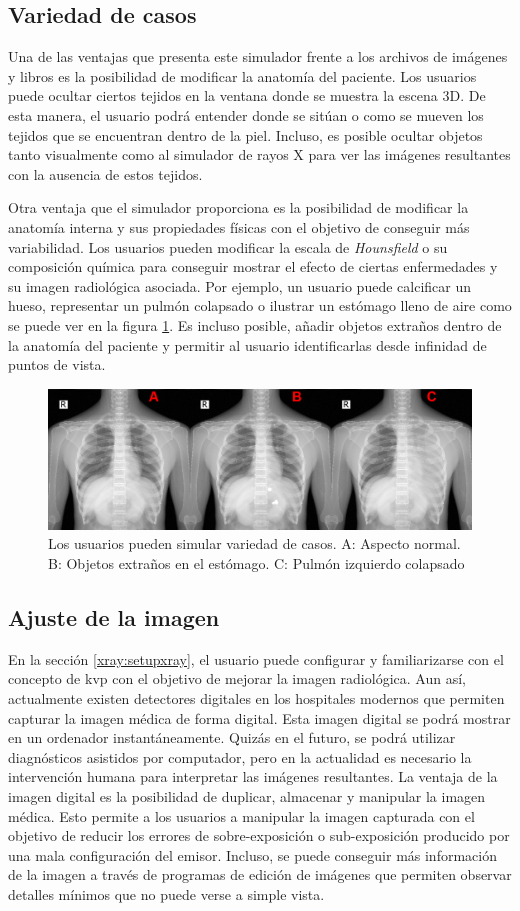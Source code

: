 \subsection{Variedad de casos}
\label{xray:variedad}
Una de las ventajas que presenta este simulador frente a los archivos de imágenes y libros es la posibilidad de modificar la anatomía del paciente. Los usuarios puede ocultar ciertos tejidos en la ventana donde se muestra la escena 3D. De esta manera, el usuario podrá entender donde se sitúan o como se mueven los tejidos que se encuentran dentro de la piel. Incluso, es posible ocultar objetos tanto visualmente como al simulador de rayos X para ver las imágenes resultantes con la ausencia de estos tejidos. 

Otra ventaja que el simulador proporciona es la posibilidad de modificar la anatomía interna y sus propiedades físicas con el objetivo de conseguir más variabilidad. Los usuarios pueden modificar la escala de \emph{Hounsfield} o su composición química para conseguir mostrar el efecto de ciertas enfermedades y su imagen radiológica asociada. Por ejemplo, un usuario puede calcificar un hueso, representar un pulmón colapsado o ilustrar un estómago lleno de aire como se puede ver en la figura \ref{fig:disease}. Es incluso posible, añadir objetos extraños dentro de la anatomía del paciente y permitir al usuario identificarlas desde infinidad de puntos de vista.

\begin{figure}[h]
\centering
\includegraphics[width=0.5\linewidth]{IMG/disease.png}
\caption{\label{fig:disease} Los usuarios pueden simular variedad de casos. A: Aspecto normal. B: Objetos extraños en el estómago. C: Pulmón izquierdo colapsado }
\end{figure}

\subsection{Ajuste de la imagen}
\label{xray:ajustes}
En la sección \ref{xray:setupxray}, el usuario puede configurar y familiarizarse con el concepto de \ac{kvp} con el objetivo de mejorar la imagen radiológica. Aun así, actualmente existen detectores digitales en los hospitales modernos que permiten capturar la imagen médica de forma digital. Esta imagen digital se podrá mostrar en un ordenador instantáneamente. Quizás en el futuro, se podrá utilizar diagnósticos asistidos por computador, pero en la actualidad es necesario la intervención humana para interpretar las imágenes resultantes. La ventaja de la imagen digital es la posibilidad de duplicar, almacenar y manipular la imagen médica. Esto permite a los usuarios a manipular la imagen capturada con el objetivo de reducir los errores de sobre-exposición o sub-exposición producido por una mala configuración del emisor. Incluso, se puede conseguir más información de la imagen a través de programas de edición de imágenes que permiten observar detalles mínimos que no puede verse a simple vista.  

